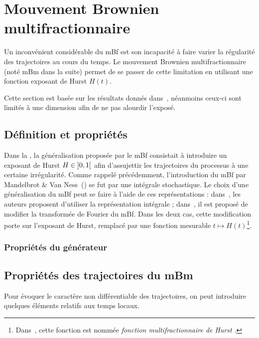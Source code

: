 \section{Mouvement Brownien multifractionnaire}
Un inconvénient considérable du mBf est son incapacité à faire varier
la régularité des trajectoires au cours du temps. Le mouvement
Brownien multifractionnaire (noté mBm dans la suite) permet de se
passer de cette limitation en utilisant une fonction exposant de Hurst
$H(t)$.

Cette section est basée sur les résultats donnés
dans~\cite{ayache2018}, néanmoins ceux-ci sont limités à une dimension
afin de ne pas alourdir l'exposé.

\subsection{Définition et propriétés}
\label{subsec:mBm-def}

Dans la , la généralisation proposée par le mBf
consistait à introduire un exposant de Hurst $H\in\left]0,1\right[$ afin
d'assujettir les trajectoires du processus à une certaine
irrégularité. Comme rappelé précédemment, l'introduction du mBf par
Mandelbrot \& Van Ness~(\cite{mandelbrot1968}) se fut par une
intégrale stochastique. Le choix d'une généralisation du mBf peut se
faire à l'aide de ces représentations : dans~\cite{peltier1995}, les
auteurs proposent d'utiliser la représentation intégrale ;
dans~\cite{ayache2018}, il est proposé de modifier la transformée de
Fourier du mBf. Dans les deux cas, cette modification porte sur
l'exposant de Hurst, remplacé par une fonction mesurable
$t\mapsto H(t)$\footnote{Dans~\cite{ayache2018}, cette fonction est
  nommée \emph{\og fonction multifractionnaire de Hurst \fg{}}.}.

\subsubsection{Propriétés du générateur}

\subsection{Propriétés des trajectoires du mBm}

\begin{prerequis}
  Pour évoquer le caractère non différentiable des trajectoires, on
  peut introduire quelques éléments relatifs aux temps locaux.
\end{prerequis}


